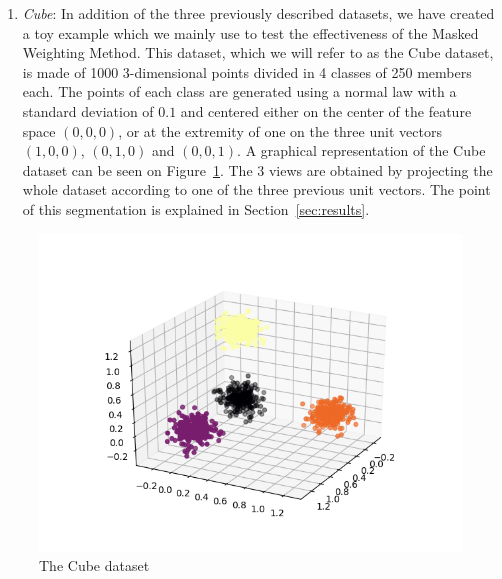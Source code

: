 \begin{enumerate}
        \item \textit{Cube}: In addition of the three previously described datasets, we have created a toy example which we mainly use to test the effectiveness of the Masked Weighting Method. This dataset, which we will refer to as the Cube dataset, is made of 1000 3-dimensional points divided in 4 classes of 250 members each. The points of each class are generated using a normal law with a standard deviation of $0.1$ and centered either on the center of the feature space $(0,0,0)$, or at the extremity of one on the three unit vectors $(1,0,0)$, $(0,1,0)$ and $(0,0,1)$. A graphical representation of the Cube dataset can be seen on Figure~\ref{fig:cube}. The 3 views are obtained by projecting the whole dataset according to one of the three previous unit vectors. The point of this segmentation is explained in Section~\ref{sec:results}.
	\end{enumerate}

    \begin{figure}[h]
        \centering
        \includegraphics[scale=.7]{img/data}
        \caption{The Cube dataset}
\label{fig:cube}
    \end{figure}
	

